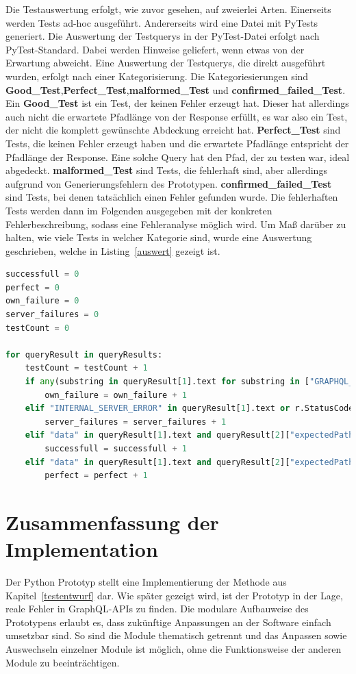 Die Testauswertung erfolgt, wie zuvor gesehen, auf zweierlei Arten.
Einerseits werden Tests ad-hoc ausgeführt.
Andererseits wird eine Datei mit PyTests generiert.
Die Auswertung der Testquerys in der PyTest-Datei erfolgt nach PyTest-Standard. Dabei werden Hinweise geliefert, wenn etwas von der Erwartung abweicht.
Eine Auswertung der Testquerys, die direkt ausgeführt wurden, erfolgt nach einer Kategorisierung.
Die Kategoriesierungen sind \textbf{Good\_Test},\textbf{Perfect\_Test},\textbf{malformed\_Test} und \textbf{confirmed\_failed\_Test}.
Ein \textbf{Good\_Test} ist ein Test, der keinen Fehler erzeugt hat.
Dieser hat allerdings auch nicht die erwartete Pfadlänge von der Response erfüllt, es war also ein Test,
der nicht die komplett gewünschte Abdeckung erreicht hat.
\textbf{Perfect\_Test} sind Tests, die keinen Fehler erzeugt haben und die erwartete Pfadlänge entspricht der Pfadlänge der Response.
Eine solche Query hat den Pfad, der zu testen war, ideal abgedeckt.
\textbf{malformed\_Test} sind Tests, die fehlerhaft sind, aber allerdings aufgrund von Generierungsfehlern des Prototypen.
\textbf{confirmed\_failed\_Test} sind Tests, bei denen tatsächlich einen Fehler gefunden wurde.
Die fehlerhaften Tests werden dann im Folgenden ausgegeben mit der konkreten Fehlerbeschreibung, sodass eine Fehleranalyse möglich wird.
Um Maß darüber zu halten, wie viele Tests in welcher Kategorie sind, wurde eine Auswertung geschrieben, welche in Listing~\ref{auswert} gezeigt ist.

\begin{lstlisting}[language=Python, caption={Auswertung der Antworten}, label={auswert}]
successfull = 0
perfect = 0
own_failure = 0
server_failures = 0
testCount = 0

for queryResult in queryResults:
    testCount = testCount + 1
    if any(substring in queryResult[1].text for substring in ["GRAPHQL_PARSE_FAILED", "GRAPHQL_VALIDATION_FAILED"]):
        own_failure = own_failure + 1
    elif "INTERNAL_SERVER_ERROR" in queryResult[1].text or r.StatusCode == 500:
        server_failures = server_failures + 1
    elif "data" in queryResult[1].text and queryResult[2]["expectedPathLength"] > queryResult[2]["pathLengthFromResult"]:
        successfull = successfull + 1
    elif "data" in queryResult[1].text and queryResult[2]["expectedPathLength"] == queryResult[2]["pathLengthFromResult"]:
        perfect = perfect + 1
\end{lstlisting}

\newpage

\section{Zusammenfassung der Implementation}

Der Python Prototyp stellt eine Implementierung der Methode aus Kapitel~\ref{testentwurf} dar.
Wie später gezeigt wird, ist der Prototyp in der Lage, reale Fehler in GraphQL-APIs zu finden.
Die modulare Aufbauweise des Prototypens erlaubt es, dass zukünftige Anpassungen an der Software einfach umsetzbar sind.
So sind die Module thematisch getrennt und das Anpassen sowie Auswechseln einzelner Module ist möglich, ohne die Funktionsweise
der anderen Module zu beeinträchtigen.


